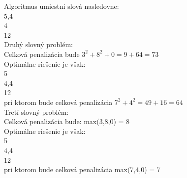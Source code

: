 \documentclass[paper=a4, fontsize=11pt]{scrartcl} %
\numberwithin{equation}{section} %
\numberwithin{figure}{section} %
\numberwithin{table}{section} %
\begin{document}
Algoritmus umiestni slová nasledovne: \\
5,4 \\
4 \\
12 \\

Druhý slovný problém: \\
Celková penalizácia bude $3^2 + 8^2 + 0 = 9 + 64 = 73$ \\

Optimálne riešenie je však: \\
5 \\
4,4 \\
12 \\
pri ktorom bude celková penalizácia $7^2 + 4^2 = 49 + 16 = 64$ \\

Tretí slovný problém: \\
Celková penalizácia bude: max(3,8,0) = 8 \\

Optimálne riešenie je však: \\
5 \\
4,4 \\
12 \\
pri ktorom bude celková penalizácia max(7,4,0) = 7 \\
\end{document}
